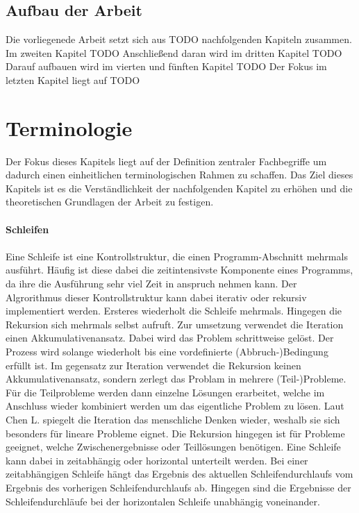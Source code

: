 \documentclass{article}
\begin{document}
    \subsection{Aufbau der Arbeit}
    Die vorliegenede Arbeit setzt sich aus TODO nachfolgenden Kapiteln zusammen. 
    Im zweiten Kapitel TODO
    Anschließend daran wird im dritten Kapitel TODO
    Darauf aufbauen wird im vierten und fünften Kapitel TODO
    Der Fokus im letzten Kapitel liegt auf TODO 
    \newpage
    \section{Terminologie}
    Der Fokus dieses Kapitels liegt auf der Definition zentraler Fachbegriffe um dadurch einen einheitlichen terminologischen Rahmen zu schaffen. 
    Das Ziel dieses Kapitels ist es die Verständlichkeit der nachfolgenden Kapitel zu erhöhen und die theoretischen Grundlagen der Arbeit zu festigen.\\
    \\
    \textbf{Schleifen}\\
    \\
    Eine Schleife ist eine Kontrollstruktur, die einen Programm-Abschnitt mehrmals ausführt. \cite{22}
    Häufig ist diese dabei die zeitintensivste Komponente eines Programms, da ihre die Ausführung sehr viel Zeit in anspruch nehmen kann. \cite{1}
    Der Algrorithmus dieser Kontrollstruktur kann dabei iterativ oder rekursiv implementiert werden. Ersteres wiederholt die Schleife mehrmals. Hingegen die Rekursion sich mehrmals selbst aufruft. \cite{3}
    Zur umsetzung verwendet die Iteration einen Akkumulativenansatz. Dabei wird das Problem schrittweise gelöst. Der Prozess wird solange wiederholt bis eine vordefinierte (Abbruch-)Bedingung erfüllt ist. \cite{3}
    Im gegensatz zur Iteration verwendet die Rekursion keinen Akkumulativenansatz, sondern zerlegt das Problam in mehrere (Teil-)Probleme. Für die Teilprobleme werden dann einzelne Lösungen erarbeitet, welche im Anschluss wieder kombiniert werden um das eigentliche Problem zu lösen. \cite{3}
    Laut Chen L. spiegelt die Iteration das menschliche Denken wieder, weshalb sie sich besonders für lineare Probleme eignet. 
    Die Rekursion hingegen ist für Probleme geeignet, welche Zwischenergebnisse oder Teillösungen benötigen. \cite{3}
    Eine Schleife kann dabei in zeitabhängig oder horizontal unterteilt werden. Bei einer zeitabhängigen Schleife hängt das Ergebnis des aktuellen Schleifendurchlaufs vom Ergebnis des vorherigen Schleifendurchlaufs ab. Hingegen sind die Ergebnisse der Schleifendurchläufe bei der horizontalen Schleife unabhängig voneinander. \cite{5}\\
\end{document}
